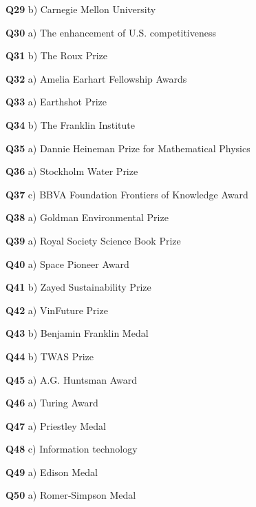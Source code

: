 \textbf{Q29} b) Carnegie Mellon University\par
\textbf{Q30} a) The enhancement of U.S. competitiveness\par
\textbf{Q31} b) The Roux Prize\par
\textbf{Q32} a) Amelia Earhart Fellowship Awards\par
\textbf{Q33} a) Earthshot Prize\par
\textbf{Q34} b) The Franklin Institute\par
\textbf{Q35} a) Dannie Heineman Prize for Mathematical Physics\par
\textbf{Q36} a) Stockholm Water Prize\par
\textbf{Q37} c) BBVA Foundation Frontiers of Knowledge Award\par
\textbf{Q38} a) Goldman Environmental Prize\par
\textbf{Q39} a) Royal Society Science Book Prize\par
\textbf{Q40} a) Space Pioneer Award\par
\textbf{Q41} b) Zayed Sustainability Prize\par
\textbf{Q42} a) VinFuture Prize\par
\textbf{Q43} b) Benjamin Franklin Medal\par
\textbf{Q44} b) TWAS Prize\par
\textbf{Q45} a) A.G. Huntsman Award\par
\textbf{Q46} a) Turing Award\par
\textbf{Q47} a) Priestley Medal\par
\textbf{Q48} c) Information technology\par
\textbf{Q49} a) Edison Medal\par
\textbf{Q50} a) Romer‑Simpson Medal\par